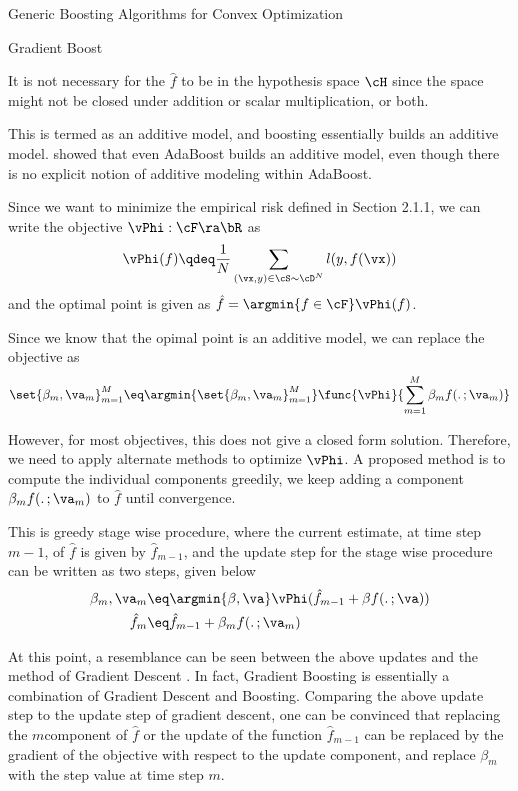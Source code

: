 \documentclass{article}
\begin{document}
\begin{psection}{Generic Boosting Algorithms for Convex Optimization}
\begin{psubsection}{Gradient Boost}
		\begin{remark}
			It is not necessary for the $\hat{f}$ to be in the hypothesis space $\cH$ since the space might not be closed under addition or scalar multiplication, or both.
		\end{remark}

		This is termed as an additive model, and boosting essentially builds an additive model. \cite{additive} showed that even AdaBoost builds an additive model, even though there is no explicit notion of additive modeling within AdaBoost.

		Since we want to minimize the empirical risk defined in Section 2.1.1, we can write the objective $\vPhi : \cF \ra \bR$ as
		\begin{align*}
			\vPhi(f) \qdeq \frac{1}{N} \sum_{(\vx, y) \in \cS \sim \cD^N} l(y, f(\vx))
		\end{align*}
		and the optimal point is given as $\hat{f} = \argmin{f \in \cF} \vPhi(f)$.

		Since we know that the opimal point is an additive model, we can replace the objective as
		\begin{align*}
			\set{\beta_m, \va_m}_{m = 1}^M \eq \argmin{\set{\beta_m, \va_m}_{m = 1}^M} \func{\vPhi}{\sum_{m = 1}^M \beta_m f(.\,;\va_m)}
		\end{align*}

		However, for most objectives, this does not give a closed form solution. Therefore, we need to apply alternate methods to optimize $\vPhi$. A proposed method is to compute the individual components greedily, \ie we keep adding a component $\beta_m f(.\,; \va_m)$ to $\hat{f}$ until convergence.

		This is greedy stage wise procedure, where the current estimate, \ie at time step $m - 1$, of $\hat{f}$ is given by $\hat{f}_{m - 1}$, and the update step for the stage wise procedure can be written as two steps, given below
		\begin{align*}
			\beta_m, \va_m	&\eq	\argmin{\beta, \va} \vPhi(\hat{f}_{m - 1} + \beta f(.\,; \va)) \\
			\hat{f}_m		&\eq	\hat{f}_{m - 1} + \beta_m f(.\,; \va_m)
		\end{align*}

		At this point, a resemblance can be seen between the above updates and the method of Gradient Descent \citep{fgt, gbm}. In fact, Gradient Boosting is essentially a combination of Gradient Descent and Boosting. Comparing the above update step to the update step of gradient descent, one can be convinced that replacing the $m$\tth component of $\hat{f}$ or the update of the function $\hat{f}_{m - 1}$ can be replaced by the gradient of the objective with respect to the update component, and replace $\beta_m$ with the step value at time step $m$.


\end{psubsection}
\end{psection}
\end{document}
